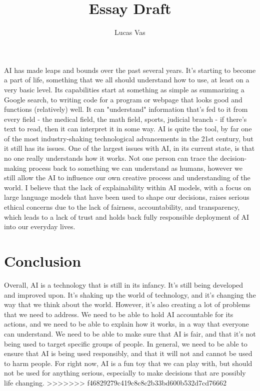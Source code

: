 \documentclass[12pt]{article}
\title{Essay Draft}
\author{Lucas Vas}
\date{}
\begin{document}
    
    \thispagestyle{firstPage}
    \maketitle
    
    AI has made leaps and bounds over the past several years. It's starting to become a part of
    life, something that we all should understand how to use, at least on a very basic level. Its
    capabilities start at something as simple as summarizing a Google search, to writing code
    for a program or webpage that looks good and functions (relatively) well. It can "understand"
    information that's fed to it from every field - the medical field, the math field, sports, 
    judicial branch - if there's text to read, then it can interpret it in some way. AI is quite
    the tool, by far one of the most industry-shaking technological advancements in the 21st century,
    but it still has its issues. One of the largest issues with AI, in its current state, is that
    no one really understands how it works. Not one person can trace the decision-making process
    back to something we can understand as humans, however we still allow the AI to influence our
    own creative process and understanding of the world. I believe that the lack of explainability
    within AI models, with a focus on large language models that have been used to shape our
    decisions, raises serious ethical concerns due to the lack of fairness, accountability, and 
    transparency, which leads to a lack of trust and holds back fully responsible deployment of AI
    into our everyday lives.

    
    
    

    \section{Conclusion}
    Overall, AI is a technology that is still in its infancy. It's still being developed and
    improved upon. It's shaking up the world of technology, and it's changing the way that we think
    about the world. However, it's also creating a lot of problems that we need to address. We need
    to be able to hold AI accountable for its actions, and we need to be able to explain how it works,
    in a way that everyone can understand. We need to be able to make sure that AI is fair, and that
    it's not being used to target specific groups of people. In general, we need to be able to ensure
    that AI is being used responsibly, and that it will not and cannot be used to harm people. For
    right now, AI is a fun toy that we can play with, but should not be used for anything serious,
    especially to make decisions that are possibly life changing.
>>>>>>> f46829279c419c8c8c2b33bd600b532d7cd76662
\end{document}
